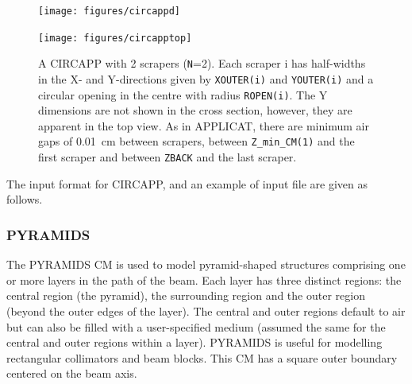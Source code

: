\documentclass[12pt,twoside]{article}
\begin{document}
\begin{figure}[htp]
\begin{center}
\leavevmode
\texttt{[image: figures/circappd]}
\end{center}
\vspace{-1.6cm}
\texttt{[image: figures/circapptop]}
\caption[CIRCAPP CM geometry]
{A CIRCAPP with 2 scrapers ({\tt N}=2).  Each scraper i has half-widths in the
X- and Y-directions given by {\tt XOUTER(i)} and {\tt YOUTER(i)} and a
circular opening in the centre with radius {\tt ROPEN(i)}.
The Y dimensions are not shown in the cross section, however, they
are apparent in the top view.  As in APPLICAT, there are minimum air gaps
of 0.01~cm between scrapers, between {\tt Z\_min\_CM(1)} and the first scraper
and between {\tt ZBACK} and the last scraper.}
\label{fig_CIRCAPPD}
\end{figure}

\clearpage

The input format for CIRCAPP, and an example of input file are given as follows.

\begin{small}

\end{small}



\clearpage

\subsubsection{PYRAMIDS}
\renewcommand{\rightmark}{PYRAMIDS CM}
The PYRAMIDS CM is used to model pyramid-shaped structures comprising
one or more layers in the path of
the beam.  Each layer has three distinct regions: the central region
(the pyramid), the
surrounding region and the outer region (beyond the outer edges of the layer).
The central and outer regions default to air but can also be filled
with a user-specified medium (assumed the same for the central and outer
regions within a layer).
PYRAMIDS is useful for modelling rectangular collimators and beam blocks.
This CM has a square outer boundary centered on
the beam axis.
\end{document}

